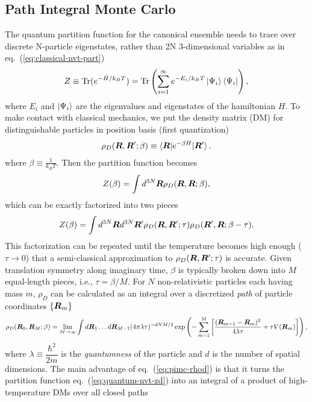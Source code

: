 \subsection{Path Integral Monte Carlo} \label{sec:method-pimc}
The quantum partition function for the canonical ensemble needs to trace over discrete N-particle eigenstates, rather than 2N 3-dimensional variables as in eq.~(\ref{eq:classical-nvt-part})
\begin{align}
Z\equiv \text{Tr}(e^{-\hat{H}/k_BT})=\text{Tr}\left(
\sum\limits_{i=1}^{\infty} e^{-E_i/k_BT}\ket{\Psi_i}\bra{\Psi_i}
\right),
\end{align}
where $E_i$ and $\ket{\Psi_i}$ are the eigenvalues and eigenstates of the hamiltonian $H$. To make contact with classical mechanics, we put the density matrix (DM) for distinguishable particles in position basis (first quantization)
\begin{align}
\rho_D(\boldsymbol{R}, \boldsymbol{R}'; \beta) \equiv \braket{\boldsymbol{R}|e^{-\beta H}|\boldsymbol{R}'},
\end{align}
where $\beta\equiv \frac{1}{k_B T}$. 
Then the partition function becomes
\begin{align} \label{eq:quantum-nvt-zd}
Z(\beta) = \int d^{3N}\boldsymbol{R} \rho_D(\boldsymbol{R},\boldsymbol{R};\beta),
\end{align}
which can be exactly factorized into two pieces
\begin{align}
Z(\beta) = \int d^{3N}\boldsymbol{R}d^{3N}\boldsymbol{R}' \rho_D(\boldsymbol{R},\boldsymbol{R}';\tau)\rho_D(\boldsymbol{R}',\boldsymbol{R};\beta-\tau).
\end{align}
This factorization can be repeated until the temperature becomes high enough ($\tau\rightarrow0$) that a semi-classical approximation to $\rho_D(\boldsymbol{R},\boldsymbol{R}';\tau)$ is accurate. Given translation symmetry along imaginary time, $\beta$ is typically broken down into $M$ equal-length pieces, i.e., $\tau=\beta/M$.
For $N$ non-relativistic particles each having mass $m$, $\rho_D$ can be calculated as an integral over a discretized \textit{path} of particle coordinates $\{\boldsymbol{R}_m\}$
\begin{align} \label{eq:pimc-rhod}
\rho_D(\boldsymbol{R}_0,\boldsymbol{R}_M;\beta) = \lim\limits_{M\rightarrow\infty} \int d\boldsymbol{R}_1\dots d\boldsymbol{R}_{M-1}
(4\pi\lambda\tau)^{-dNM/2}\exp\left(
-\sum\limits_{m=1}^M \left[
\dfrac{(\boldsymbol{R}_{m-1}-\boldsymbol{R}_m)^2}{4\lambda\tau} + \tau V(\boldsymbol{R}_m)
\right]
\right),
\end{align}
where $\lambda\equiv\dfrac{\hbar^2}{2m}$ is the \emph{quantumness} of the particle and $d$ is the number of spatial dimensions.
The main advantage of eq.~(\ref{eq:pimc-rhod}) is that it turns the partition function eq.~(\ref{eq:quantum-nvt-zd}) into an integral of a product of high-temperature DMs over all closed paths
